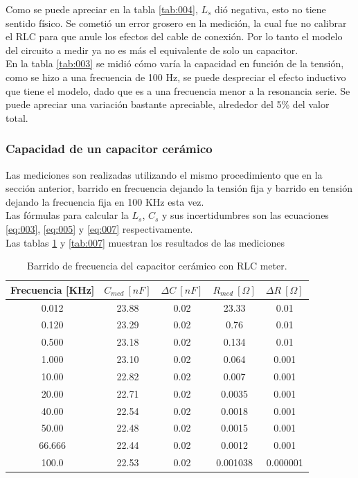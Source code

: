 \documentclass[a4paper,10pt]{article}
\begin{document}
		\indent Como se puede apreciar en la tabla \ref{tab:004}, $L_s$ dió 
		negativa, esto no tiene sentido físico. Se cometió un error grosero en 
		la medición, la cual fue no calibrar el RLC para que anule los efectos 
		del cable de conexión. Por lo tanto el modelo del circuito a medir ya no
		es más el equivalente de solo un capacitor. \\
		\indent En la tabla \ref{tab:003} se midió cómo varía la capacidad en 
		función de la tensión, como se hizo a una frecuencia de 100 Hz, se puede
		despreciar el efecto inductivo que tiene el modelo, dado que es a una 
		frecuencia menor a la resonancia serie. Se puede apreciar una variación 
		bastante apreciable, alrededor del 5\% del valor total.
		
		\subsubsection{Capacidad de un capacitor cer\'amico}
		\indent Las mediciones son realizadas utilizando el mismo procedimiento
		que en la sección anterior, barrido en frecuencia dejando la tensión 
		fija y barrido en tensión dejando la frecuencia fija en 100 KHz esta 
		vez. \\
		
		\indent Las fórmulas para calcular la $L_s$, $C_s$ y sus incertidumbres 
		son las ecuaciones \ref{eq:003}, \ref{eq:005} y \ref{eq:007} 
		respectivamente. \\
		\indent Las tablas \ref{tab:006} y \ref{tab:007} muestran los resultados
		de las mediciones 
	
		\begin{table}[!htp]
			\centering
			\begin{tabular}{|c|c|c|c|c|}
				\hline
				Frecuencia [KHz] & $C_{med}~[nF]$ & $\Delta C~[nF]$ & 
				$R_{med}~[\Omega]$ & $\Delta R~[\Omega]$ \\
				\hline
				0.012 &	23.88 & 0.02 & 23.33 & 0.01 \\
				\hline
				0.120 &	23.29 & 0.02 & 0.76 & 0.01 \\
				\hline
				0.500 &	23.18 & 0.02 & 0.134 & 0.01 \\
				\hline
				1.000 &	23.10 & 0.02 & 0.064 & 0.001 \\
				\hline
				10.00 &	22.82 & 0.02 & 0.007 & 0.001 \\
				\hline
				20.00 &	22.71 & 0.02 & 0.0035 & 0.001 \\
				\hline
				40.00 &	22.54 & 0.02 & 0.0018 & 0.001 \\
				\hline
				50.00 &	22.48 & 0.02 & 0.0015 & 0.001 \\
				\hline
				66.666 & 22.44 & 0.02 & 0.0012 & 0.001 \\
				\hline
				100.0 &	22.53 & 0.02 & 0.001038 & 0.000001 \\
				\hline
			\end{tabular}
			\caption{Barrido de frecuencia del capacitor cerámico con RLC 
			meter.} 
			\label{tab:006}
		\end{table}	
\end{document}
